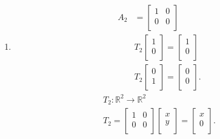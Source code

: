 \documentclass{report}
\begin{document}
{\begin{enumerate}[label=(\roman*)]
		$ T_1$ fixes the x-component and changes the sing of the y-component.\\
		$ T_1$ reflects points in the $ x$-axis.\\
                \item 
			\raggedcolumns
			\begin{multicols}{2}
			\begin{align*}
				A_2 & = \begin{bmatrix}
				1 & 0\\
				0 & 0\\
				\end{bmatrix}\\
				&  T_2 \begin{bmatrix}
				1\\
				0\\
				\end{bmatrix}
				= \begin{bmatrix}
				1\\
				0\\
				\end{bmatrix}
				\\
				& T_2 \begin{bmatrix}
				0\\
				1\\
				\end{bmatrix}
				= \begin{bmatrix}
				0\\
				0\\
				\end{bmatrix}
			.\end{align*}
			\break
			\begin{align*}
				    T_2 : \mathbb{R} ^2 \to \mathbb{R} ^2\\
				    T_2 = \begin{bmatrix}
				    1 & 0\\
				    0 & 0\\
				    \end{bmatrix} \begin{bmatrix}
				    x\\
				    y\\
				    \end{bmatrix}
				    = \begin{bmatrix}
				    x\\
				    0\\
				    \end{bmatrix}
			.\end{align*}
			\end{multicols}
			\begin{tikzpicture}[line cap=round,line join=round,>=Stealth,
                    every node/.style={inner sep=0pt, font=\small}]


\end{tikzpicture}
\end{enumerate}}
\end{document}
